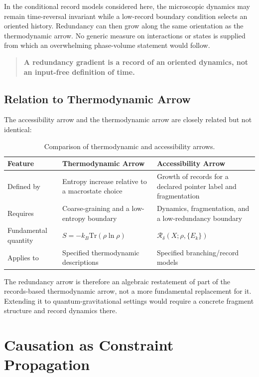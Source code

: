 \documentclass[12pt,a4paper,openany]{book}
\begin{document}
In the conditional record models considered here, the microscopic dynamics may remain time-reversal invariant while a low-record boundary condition selects an oriented history.  Redundancy can then grow along the same orientation as the thermodynamic arrow.  No generic measure on interactions or states is supplied from which an overwhelming phase-volume statement would follow.

\begin{quote}
\textbf{A redundancy gradient is a record of an oriented dynamics, not an input-free definition of time.}
\end{quote}

\subsection{Relation to Thermodynamic Arrow}

The accessibility arrow and the thermodynamic arrow are closely related but not identical:

\begin{table}[ht]
\centering
\small
\begin{tabular}{|P{3.5cm}|P{4.5cm}|P{4.5cm}|}
\hline
\textbf{Feature} & \textbf{Thermodynamic Arrow} & \textbf{Accessibility Arrow} \\
\hline
Defined by & Entropy increase relative to a macrostate choice & Growth of records for a declared pointer label and fragmentation \\
\hline
Requires & Coarse-graining and a low-entropy boundary & Dynamics, fragmentation, and a low-redundancy boundary \\
\hline
Fundamental quantity & $S = -k_B \text{Tr}(\rho \ln \rho)$ & $\mathcal{R}_\delta(X;\rho,\{E_k\})$ \\
\hline
Applies to & Specified thermodynamic descriptions & Specified branching/record models \\
\hline
\end{tabular}
\caption{Comparison of thermodynamic and accessibility arrows.}
\label{F-tab:arrows}
\end{table}

The redundancy arrow is therefore an algebraic restatement of part of the records-based thermodynamic arrow, not a more fundamental replacement for it.  Extending it to quantum-gravitational settings would require a concrete fragment structure and record dynamics there.

\section{Causation as Constraint Propagation}
\label{F-sec:causation}
\end{document}
